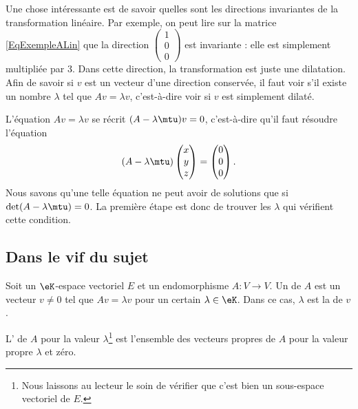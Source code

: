 Une chose intéressante est de savoir quelles sont les directions invariantes de la transformation linéaire. Par exemple, on peut lire sur la matrice \eqref{EqExempleALin} que la direction $\begin{pmatrix}
	1	\\
	0	\\
	0
\end{pmatrix}$ est invariante : elle est simplement multipliée par $3$. Dans cette direction, la transformation est juste une dilatation. Afin de savoir si $v$ est un vecteur d'une direction conservée, il faut voir s'il existe un nombre $\lambda$ tel que $Av=\lambda v$, c'est-à-dire voir si $v$ est simplement dilaté.

L'équation $Av=\lambda v$ se récrit $(A-\lambda\mtu)v=0$, c'est-à-dire qu'il faut résoudre l'équation
\begin{equation}
	(A-\lambda\mtu)\begin{pmatrix}
		x	\\
		y	\\
		z
	\end{pmatrix}=
	\begin{pmatrix}
		0	\\
		0	\\
		0
	\end{pmatrix}.
\end{equation}
Nous savons qu'une telle équation ne peut avoir de solutions que si $\det(A-\lambda\mtu)=0$. La première étape est donc de trouver les $\lambda$ qui vérifient cette condition.

\subsection{Dans le vif du sujet}

\begin{definition}      \label{DefooMMKZooVcskCc}
    Soit un \( \eK\)-espace vectoriel \( E\) et un endomorphisme \( A\colon V\to V\). Un  de \( A\) est un vecteur \( v \neq 0\) tel que \( Av=\lambda v\) pour un certain \( \lambda\in \eK\). Dans ce cas, \( \lambda\) est la  de \( v\).

    L' de \( A\) pour la valeur \( \lambda\)\footnote{Nous laissons au lecteur le soin de vérifier que c'est bien un sous-espace vectoriel de \( E\).} est l'ensemble des vecteurs propres de \( A\) pour la valeur propre \( \lambda\) et zéro.
\end{definition}

